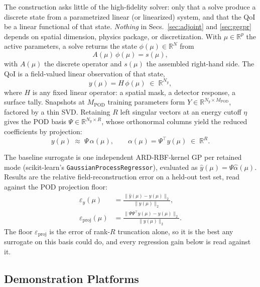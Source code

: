 \documentclass[]{ANStopical}
\begin{document}
The construction asks little of the high-fidelity solver: only that a solve produce a discrete state from a parametrized linear (or linearized) system, and that the QoI be a linear functional of that state. \emph{Nothing} in Secs.~\ref{sec:adjoint} and \ref{sec:gegpr} depends on spatial dimension, physics package, or discretization. With $\mu\in\mathbb{R}^p$ the active parameters, a solve returns the state $\phi(\mu)\in\mathbb{R}^{N}$ from
\begin{equation}
    A(\mu)\,\phi(\mu) = s(\mu),
    \label{eq:forward}
\end{equation}
with $A(\mu)$ the discrete operator and $s(\mu)$ the assembled right-hand side. The QoI is a field-valued linear observation of that state,
\begin{equation}
    y(\mu) = H\,\phi(\mu) \;\in\; \mathbb{R}^{N_y},
    \label{eq:obs}
\end{equation}
where $H$ is any fixed linear operator: a spatial mask, a detector response, a surface tally. Snapshots at $M_{\mathrm{POD}}$ training parameters form $Y\in\mathbb{R}^{N_y\times M_{\mathrm{POD}}}$, factored by a thin SVD. Retaining $R$ left singular vectors at an energy cutoff $\eta$ gives the POD basis $\Psi\in\mathbb{R}^{N_y\times R}$, whose orthonormal columns yield the reduced coefficients by projection:
\begin{equation}
    y(\mu)\;\approx\;\Psi\,\alpha(\mu),
    \qquad
    \alpha(\mu) = \Psi^\top y(\mu) \;\in\; \mathbb{R}^{R}.
    \label{eq:pod}
\end{equation}

The baseline surrogate is one independent ARD-RBF-kernel GP per retained mode (scikit-learn's \texttt{Gaussian\-Process\-Regressor}), evaluated as $\hat y(\mu)=\Psi\hat\alpha(\mu)$. Results are the relative field-reconstruction error on a held-out test set, read against the POD projection floor:
\begin{align}
    \varepsilon_y(\mu) &= \frac{\lVert \hat y(\mu) - y(\mu)\rVert_2}{\lVert y(\mu)\rVert_2},
    \label{eq:epsy} \\[2pt]
    \varepsilon_{\mathrm{proj}}(\mu) &= \frac{\lVert \Psi\Psi^\top y(\mu) - y(\mu)\rVert_2}{\lVert y(\mu)\rVert_2}.
    \label{eq:epsproj}
\end{align}
The floor $\varepsilon_{\mathrm{proj}}$ is the error of rank-$R$ truncation alone, so it is the best any surrogate on this basis could do, and every regression gain below is read against it.

\subsection{Demonstration Platforms}\label{sec:platforms}
\end{document}
